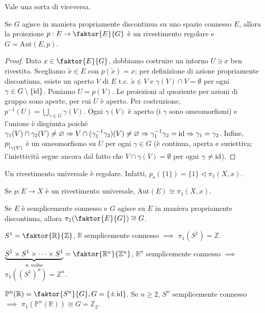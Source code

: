 Vale una sorta di viceversa.

\begin{prop}
  Se $G$ agisce in maniera propriamente discontinua su uno spazio connesso $E$, allora la proiezione $p:E \rightarrow \faktor{E}{G}$ è un rivestimento regolare e $G=\text{Aut}(E, p)$.
\end{prop}

\begin{proof}
  Dato $x \in \faktor{E}{G}$, dobbiamo costruire un intorno $U \ni x$ ben rivestito. Scegliamo $\tilde{x} \in E$ con $p(\tilde{x})=x$; per definizione di azione propriamente discontinua, esiste un aperto $V$ di $E$ t.c. $\tilde{x} \in V$ e $\gamma(V)\cap V=\emptyset$ per ogni $\gamma \in G\setminus\{\operatorname{id}\}$. Poniamo $U=p(V)$. Le proiezioni al quoziente per azioni di gruppo sono aperte, per cui $U$ è aperto.
  Per costruzione, $\displaystyle p^{-1}(U)=\bigcup_{\gamma \in G} \gamma(V)$.
  Ogni $\gamma(V)$ è aperto (i $\gamma$ sono omeomorfismi) e l'unione è disgiunta poiché $\gamma_1(V) \cap \gamma_2(V) \not=\varnothing \Rightarrow V \cap (\gamma_1^{-1}\gamma_2)(V) \not=\varnothing \Rightarrow \gamma_1^{-1}\gamma_2=\operatorname{id} \Rightarrow \gamma_1=\gamma_2$.
  Infine, $p\restrict{\gamma(V)}$ è un omeomorfismo su $U$ per ogni $\gamma \in G$ (è continua, aperta e suriettiva; l'iniettività segue ancora dal fatto che $V \cap \gamma(V)=\emptyset$ per ogni $\gamma\not=\operatorname{id}$).
\end{proof}

\begin{oss}
  Un rivestimento universale è regolare. Infatti, $p_{\star}(\{1\})=\{1\} \vartriangleleft \pi_1(X, x)$.
\end{oss}

\begin{cor}
  Se $p:E \rightarrow X$ è un rivestimento universale, $\text{Aut}(E)\cong\pi_1(X, x)$.
\end{cor}

\begin{cor}
  Se $E$ è semplicemente connesso e $G$ agisce su $E$ in maniera propriamente discontinua, allora $\pi_1(\faktor{E}{G}) \cong G$.
\end{cor}

\begin{ex}
  \begin{nlist}
    \item $S^1=\faktor{\mathbb{R}}{\mathbb{Z}}$, $\mathbb{R}$ semplicemente connesso $\implies$ $\pi_1(S^1)=\mathbb{Z}$.
    \item $\underbrace{S^1 \times S^1 \times \dots \times S^1}_{n \text{ volte}}=\faktor{\mathbb{R}^n}{\mathbb{Z}^n}$, $\mathbb{R}^n$ semplicemente connesso $\implies$ $\pi_1((S^1)^n)=\mathbb{Z}^n$.
    \item $\mathbb{P}^n(\mathbb{R})=\faktor{S^n}{G}, G=\{\pm\id\}$. Se $n \ge 2$, $S^n$ semplicemente connesso $\implies$ $\pi_1(\mathbb{P}^n(\mathbb{R})) \cong G=\mathbb{Z}_2$.
  \end{nlist}
\end{ex}
